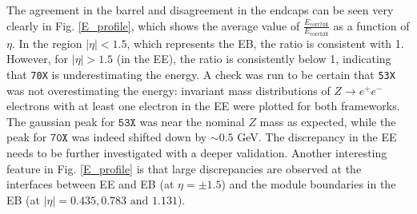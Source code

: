 \documentclass[10pt]{article}
\begin{document}
The agreement in the barrel and disagreement in the endcaps can be seen very clearly in Fig. \ref{E_profile}, which shows the average value of $\frac{E_{\text{corr}\texttt{70X}}}{E_{\text{corr}\texttt{53X}}}$ as a function of $\eta$. In the region $|\eta|<1.5$, which represents the EB, the ratio is consistent with 1. However, for $|\eta|>1.5$ (in the EE), the ratio is consistently below 1, indicating that \texttt{70X} is underestimating the energy. A check was run to be certain that \texttt{53X} was not overestimating the energy: invariant mass distributions of $Z\rightarrow e^+ e^-$ electrons with at least one electron in the EE were plotted for both frameworks. The gaussian peak for $\texttt{53X}$ was near the nominal $Z$ mass as expected, while the peak  for $\texttt{70X}$ was indeed shifted down by $\sim 0.5$ GeV. The discrepancy in the EE needs to be further investigated with a deeper validation. Another interesting feature in Fig. \ref{E_profile} is that large discrepancies are observed at the interfaces between EE and EB (at $\eta = \pm 1.5$) and the module boundaries in the EB (at $|\eta| = 0.435, 0.783 \text{ and } 1.131$).%
\newpage
\end{document}

